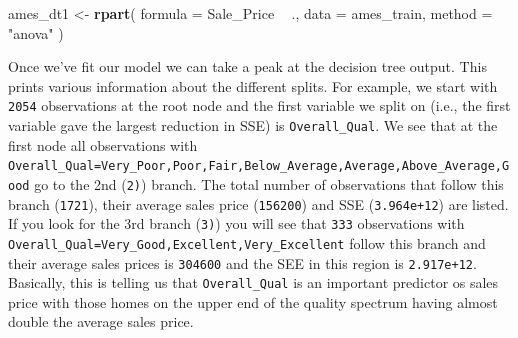 \documentclass[]{krantz}
\makeatletter
\newenvironment{Shaded}{\begin{snugshade}}{\end{snugshade}}
\newcommand{\DataTypeTok}[1]{\textcolor[rgb]{0.27,0.27,0.27}{#1}}
\newcommand{\KeywordTok}[1]{\textcolor[rgb]{0.27,0.27,0.27}{\textbf{#1}}}
\newcommand{\NormalTok}[1]{#1}
\newcommand{\OperatorTok}[1]{\textcolor[rgb]{0.43,0.43,0.43}{\textbf{#1}}}
\newcommand{\StringTok}[1]{\textcolor[rgb]{0.5,0.5,0.5}{#1}}
\newenvironment{kframe}{%
\medskip{}
\setlength{\fboxsep}{.8em}
 \def\at@end@of@kframe{}%
 \ifinner\ifhmode%
  \def\at@end@of@kframe{\end{minipage}}%
  \begin{minipage}{\columnwidth}%
 \fi\fi%
 \def\FrameCommand##1{\hskip\@totalleftmargin \hskip-\fboxsep
 \colorbox{shadecolor}{##1}\hskip-\fboxsep
     \hskip-\linewidth \hskip-\@totalleftmargin \hskip\columnwidth}%
 \MakeFramed {\advance\hsize-\width
   \@totalleftmargin\z@ \linewidth\hsize
   \@setminipage}}%
 {\par\unskip\endMakeFramed%
 \at@end@of@kframe}
\renewenvironment{Shaded}{\begin{kframe}}{\end{kframe}}
\makeatother
\begin{document}
\begin{Shaded}
\begin{Highlighting}[]
\NormalTok{ames_dt1 <-}\StringTok{ }\KeywordTok{rpart}\NormalTok{(}
  \DataTypeTok{formula =}\NormalTok{ Sale_Price }\OperatorTok{~}\StringTok{ }\NormalTok{.,}
  \DataTypeTok{data    =}\NormalTok{ ames_train,}
  \DataTypeTok{method  =} \StringTok{"anova"}
\NormalTok{)}
\end{Highlighting}
\end{Shaded}

Once we've fit our model we can take a peak at the decision tree output. This prints various information about the different splits. For example, we start with \texttt{2054} observations at the root node and the first variable we split on (i.e., the first variable gave the largest reduction in SSE) is \texttt{Overall\_Qual}. We see that at the first node all observations with \texttt{Overall\_Qual=Very\_Poor,Poor,Fair,Below\_Average,Average,Above\_Average,Good} go to the 2nd (\texttt{2)}) branch. The total number of observations that follow this branch (\texttt{1721}), their average sales price (\texttt{156200}) and SSE (\texttt{3.964e+12}) are listed. If you look for the 3rd branch (\texttt{3)}) you will see that \texttt{333} observations with \texttt{Overall\_Qual=Very\_Good,Excellent,Very\_Excellent} follow this branch and their average sales prices is \texttt{304600} and the SEE in this region is \texttt{2.917e+12}. Basically, this is telling us that \texttt{Overall\_Qual} is an important predictor os sales price with those homes on the upper end of the quality spectrum having almost double the average sales price.
\end{document}
